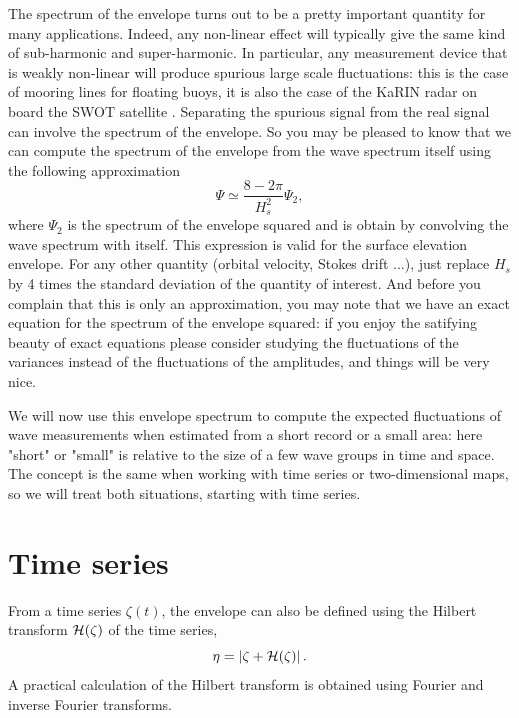 {The spectrum of the envelope turns out to be a pretty important quantity for many applications. Indeed, any non-linear effect will typically give the same kind of sub-harmonic and super-harmonic. In particular, any measurement device that is weakly non-linear will produce  spurious large scale fluctuations: this is the case of mooring lines for floating buoys, it is also the case of the KaRIN radar on board the SWOT satellite \citep{Peral&al.2015}. Separating the spurious signal from the real signal can involve the spectrum of the envelope. So you may be pleased to know that we can compute the spectrum of the envelope from the wave spectrum itself using the following approximation \citep{Tayfun&Lo1989}
\begin{equation}
    \Psi \simeq \frac{8 - 2\pi}{H_s^2}  \Psi_{2},
\label{eq:TayfunetLo}
\end{equation}
where $\Psi_2$ is the spectrum of the envelope squared and is obtain by convolving the wave spectrum with itself. This expression is valid for the surface elevation envelope. For any other quantity (orbital velocity, Stokes drift ...), just replace $H_s$ by 4 times the standard deviation of the quantity of interest. And before you complain that this is only an approximation, you may note that we have an exact equation for the spectrum of the envelope squared: if you enjoy the satifying beauty of exact equations please consider studying the fluctuations of the variances instead of the fluctuations of the amplitudes, and things will be very nice. 

We will now use this envelope spectrum to compute the expected fluctuations of wave measurements when estimated from a short record or a small area: here "short" or "small" is relative to the size of a few wave groups in time and space. The concept is the same when working with time series or two-dimensional maps, so we will treat both situations, starting with time series. 

\section{Time series}
From a time series $\zeta(t)$, the envelope can also be defined using the  Hilbert transform $\cal{H}(\zeta)$ of the time series, 
\begin{equation}
   \eta  = \left| \zeta + \cal{H}(\zeta) \right|.
   \label{eq:env_Hilbert}
\end{equation}
A practical calculation of the Hilbert transform is obtained using Fourier and inverse Fourier transforms. 


}
